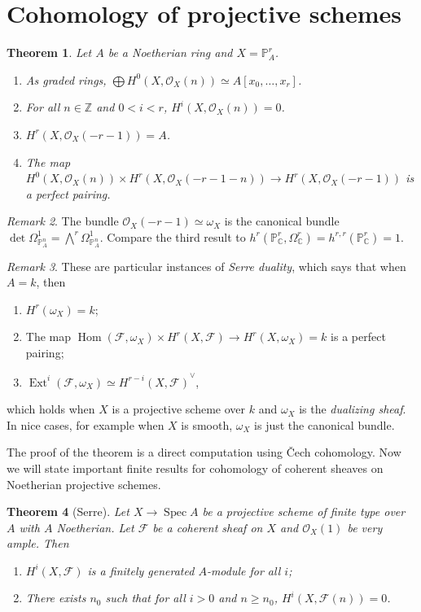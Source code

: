 \documentclass[leqno, openany]{memoir}
\newtheorem{thm}{Theorem}[section]
\theoremstyle{definition}
\theoremstyle{remark}
\newtheorem{rmk}[thm]{Remark}
\theoremstyle{plain}
\theoremstyle{definition}
\theoremstyle{remark}
\newcommand{\C}{\mathbb{C}}
\newcommand{\Z}{\mathbb{Z}}
\renewcommand{\P}{\mathbb{P}}
\newcommand{\mc}[1]{\mathcal{#1}}
\DeclareMathOperator{\Hom}{Hom}
\DeclareMathOperator{\Spec}{Spec}
\DeclareMathOperator{\Ext}{Ext}
\begin{document}
\section{Cohomology of projective schemes}%
\label{sec:cohomology_of_projective_schemes}

\begin{thm} Let $A$ be a Noetherian ring and $X = \P^r_A$.  \begin{enumerate}
    \item As graded rings, $\bigoplus H^0(X, \mc{O}_X(n)) \simeq A[x_0, \ldots,
        x_r]$.  \item For all $n \in \Z$ and $0 < i < r$, $H^i(X, \mc{O}_X(n))
        = 0$.  \item $H^r(X, \mc{O}_X(-r-1)) = A$.  \item The map $H^0(X,
\mc{O}_X(n)) \times H^r(X, \mc{O}_X(-r-1-n)) \to H^r(X, \mc{O}_X(-r-1))$ is a
perfect pairing.  \end{enumerate} \end{thm}

\begin{rmk} The bundle $\mc{O}_X(-r-1) \simeq \omega_X$ is the canonical bundle
$\det \Omega^1_{\P^n_A} = \bigwedge^r \Omega^1_{\P^n_A}$. Compare the third
result to $h^r(\P^r_{\C}, \Omega^r_{\C}) = h^{r,r}(\P^r_{\C}) = 1$.  \end{rmk}

\begin{rmk} These are particular instances of \textit{Serre duality}, which
    says that when $A = k$, then \begin{enumerate} \item $H^r(\omega_X) = k$;
        \item The map $\Hom(\mc{F}, \omega_X) \times H^r(X, \mc{F}) \to H^r(X,
            \omega_X) = k$ is a perfect pairing; \item $\Ext^i(\mc{F},
    \omega_X) \simeq {H^{r-i}(X, \mc{F})}^{\vee}$, \end{enumerate} which holds
    when $X$ is a projective scheme over $k$ and $\omega_X$ is the
    \textit{dualizing sheaf}. In nice cases, for example when $X$ is smooth,
    $\omega_X$ is just the canonical bundle.  \end{rmk}

The proof of the theorem is a direct computation using \v{C}ech cohomology. Now
we will state important finite results for cohomology of coherent sheaves on
Noetherian projective schemes.

\begin{thm}[Serre] Let $X \to \Spec A$ be a projective scheme of finite type
    over $A$ with $A$ Noetherian. Let $\mc{F}$ be a coherent sheaf on $X$ and
    $\mc{O}_X(1)$ be very ample. Then \begin{enumerate} \item $H^i(X, \mc{F})$
        is a finitely generated $A$-module for all $i$; \item There exists
$n_0$ such that for all $i > 0$ and $n \geq n_0$, $H^i(X, \mc{F}(n)) = 0$.
\end{enumerate} \end{thm}
\end{document}
